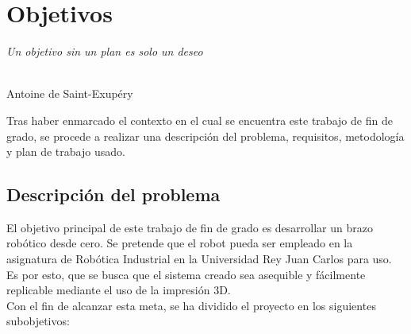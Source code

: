 \chapter{Objetivos}
\label{cap:capitulo2}

\begin{flushright}
\begin{minipage}[]{10cm}
\emph{Un objetivo sin un plan es solo un deseo}\\
\end{minipage}\\

Antoine de Saint-Exupéry\\
\end{flushright}

\vspace{1cm}

Tras haber enmarcado el contexto en el cual se encuentra este trabajo de fin de grado, se procede a realizar
una descripción del problema, requisitos, metodología y plan de trabajo usado.
\section{Descripción del problema}
\label{sec:descripcion}
El objetivo principal de este trabajo de fin de grado es desarrollar un brazo robótico desde cero. Se pretende que
el robot pueda ser empleado en la asignatura de Robótica Industrial en la Universidad Rey Juan Carlos para uso. Es por esto,
que se busca que el sistema creado sea asequible y fácilmente replicable mediante el uso de la impresión 3D.\\
Con el fin de alcanzar esta meta, se ha dividido el proyecto en los siguientes subobjetivos:

